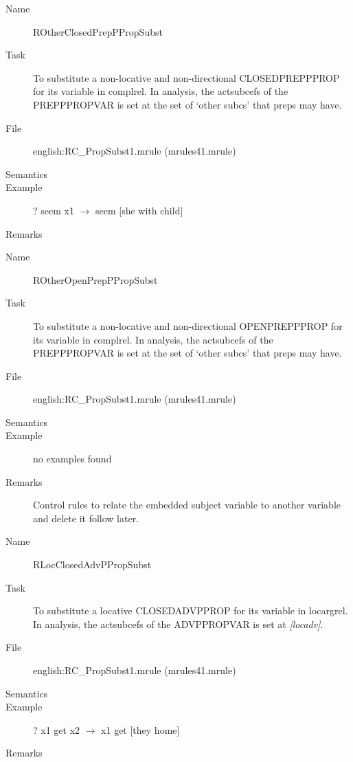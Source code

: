 \begin{description}
\vspace{1 cm}
\begin{description}
\item[Name]   ROtherClosedPrepPPropSubst
\item[Task] To substitute a non-locative and non-directional CLOSEDPREPPPROP 
for its variable in 
complrel. In analysis, the actsubcefs of the PREPPPROPVAR is set at the set of 
`other subcs' that preps may have.
\item[File] english:RC\_PropSubst1.mrule (mrules41.mrule)
\item[Semantics]
\item[Example] ? seem x1 $\rightarrow$ seem [she with child]
\item[Remarks]
\end{description}

\vspace{1 cm}
\begin{description}
\item[Name] ROtherOpenPrepPPropSubst
\item[Task] To substitute a non-locative and non-directional OPENPREPPPROP for 
its variable in 
complrel. In analysis, the actsubcefs of the PREPPPROPVAR is set at the set of 
`other subcs' that preps may have.
\item[File] english:RC\_PropSubst1.mrule (mrules41.mrule)
\item[Semantics]
\item[Example] no examples found
\item[Remarks] Control rules to relate the embedded subject variable to 
another variable and delete it follow later.
\end{description}

\vspace{1 cm}
\begin{description}
\item[Name]   RLocClosedAdvPPropSubst
\item[Task] To substitute a locative CLOSEDADVPPROP for its variable in 
locargrel. In analysis, the actsubcefs of the ADVPPROPVAR is set at {\em 
[locadv]\/}.
\item[File] english:RC\_PropSubst1.mrule (mrules41.mrule)
\item[Semantics]
\item[Example] ? x1 get x2 $\rightarrow$ x1 get [they home]
\item[Remarks]
\end{description}


\end{description}
